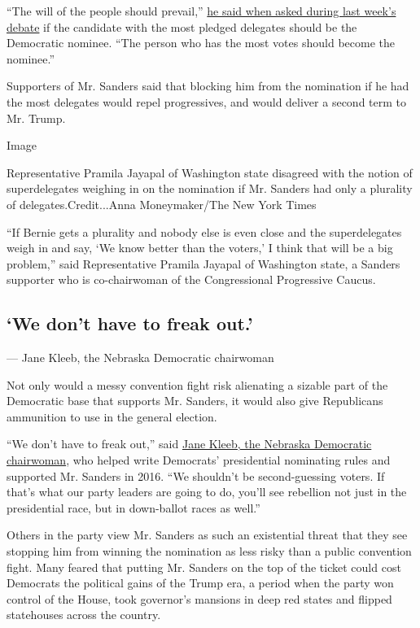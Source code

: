 ``The will of the people should prevail,''
\href{https://www.nytimes3xbfgragh.onion/2020/02/22/us/politics/democratic-primary-dnc-superdelegates.html}{he
said when asked during last week's debate} if the candidate with the
most pledged delegates should be the Democratic nominee. ``The person
who has the most votes should become the nominee.''

Supporters of Mr. Sanders said that blocking him from the nomination if
he had the most delegates would repel progressives, and would deliver a
second term to Mr. Trump.

Image

Representative Pramila Jayapal of Washington state disagreed with the
notion of superdelegates weighing in on the nomination if Mr. Sanders
had only a plurality of delegates.Credit...Anna Moneymaker/The New York
Times

``If Bernie gets a plurality and nobody else is even close and the
superdelegates weigh in and say, `We know better than the voters,' I
think that will be a big problem,'' said Representative Pramila Jayapal
of Washington state, a Sanders supporter who is co-chairwoman of the
Congressional Progressive Caucus.

\hypertarget{we-dont-have-to-freak-out}{%
\subsection{`We don't have to freak
out.'}\label{we-dont-have-to-freak-out}}

--- Jane Kleeb, the Nebraska Democratic chairwoman

Not only would a messy convention fight risk alienating a sizable part
of the Democratic base that supports Mr. Sanders, it would also give
Republicans ammunition to use in the general election.

``We don't have to freak out,'' said
\href{https://www.nytimes3xbfgragh.onion/2014/05/18/magazine/jane-kleeb-vs-the-keystone-pipeline.html}{Jane
Kleeb, the Nebraska Democratic chairwoman}, who helped write Democrats'
presidential nominating rules and supported Mr. Sanders in 2016. ``We
shouldn't be second-guessing voters. If that's what our party leaders
are going to do, you'll see rebellion not just in the presidential race,
but in down-ballot races as well.''

Others in the party view Mr. Sanders as such an existential threat that
they see stopping him from winning the nomination as less risky than a
public convention fight. Many feared that putting Mr. Sanders on the top
of the ticket could cost Democrats the political gains of the Trump era,
a period when the party won control of the House, took governor's
mansions in deep red states and flipped statehouses across the country.


